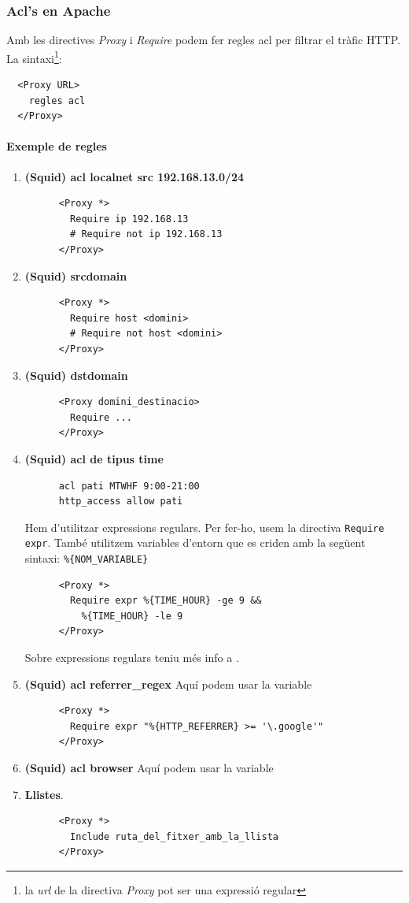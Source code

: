 \documentclass[a4paper, 11pt]{article}
\begin{document}
\subsubsection{Acl's en Apache}
Amb les directives \textit{Proxy} i \textit{Require} podem fer regles acl per filtrar el tràfic HTTP. La sintaxi\footnote{la \textit{url} de la directiva \textit{Proxy} pot ser una expressió regular}:
\begin{verbatim}
  <Proxy URL>
    regles acl
  </Proxy>
\end{verbatim}
\paragraph{Exemple de regles}
\begin{enumerate}
    \item \textbf{(Squid) acl localnet src 192.168.13.0/24}
    \begin{verbatim}
      <Proxy *>
        Require ip 192.168.13
        # Require not ip 192.168.13
      </Proxy>
    \end{verbatim}
    \item \textbf{(Squid) srcdomain}
    \begin{verbatim}
      <Proxy *>
        Require host <domini>
        # Require not host <domini>
      </Proxy>
    \end{verbatim}
    \item \textbf{(Squid) dstdomain}
    \begin{verbatim}
      <Proxy domini_destinacio>
        Require ...
      </Proxy>
    \end{verbatim}
    \item \textbf{(Squid) acl de tipus time}
    \begin{verbatim}
      acl pati MTWHF 9:00-21:00 
      http_access allow pati
    \end{verbatim}
    Hem d'utilitzar expressions regulars. Per fer-ho, usem la directiva \verb+Require expr+. També utilitzem variables d'entorn que es criden amb la següent sintaxi: \verb+%{NOM_VARIABLE}+
    \begin{verbatim}
      <Proxy *>
        Require expr %{TIME_HOUR} -ge 9 && 
          %{TIME_HOUR} -le 9 
      </Proxy>
    \end{verbatim}
    Sobre expressions regulars teniu més info a \cite{EXPR}.
    \item \textbf{(Squid) acl referrer\_regex}
    Aquí podem usar la variable %
    \begin{verbatim}
      <Proxy *>
        Require expr "%{HTTP_REFERRER} >= '\.google'"
      </Proxy>
    \end{verbatim}
    \item \textbf{(Squid) acl browser}
    Aquí podem usar la variable %
    \item \textbf{Llistes}.
    \begin{verbatim}
      <Proxy *>
        Include ruta_del_fitxer_amb_la_llista
      </Proxy>
    \end{verbatim}
    
\end{enumerate}
\end{document}
